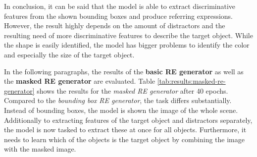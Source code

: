 In conclusion, it can be said that the model is able to extract discriminative features from the shown bounding boxes and produce referring expressions.
However, the result highly depends on the amount of distractors and the resulting need of more discriminative features to describe the target object.
While the shape is easily identified, the model has bigger problems to identify the color and especially the size of the target object.

In the following paragraphs, the results of the \textbf{basic RE generator} as well as the \textbf{masked RE generator} are evaluated.
Table \ref{tab:results:masked-re-generator} shows the results for the \emph{masked RE generator} after 40 epochs.
Compared to the \emph{bounding box RE generator}, the task differs substantially.
Instead of bounding boxes, the model is shown the image of the whole scene.
Additionally to extracting features of the target object and distractors separately, the model is now tasked to extract these at once for all objects.
Furthermore, it needs to learn which of the objects is the target object by combining the image with the masked image.

